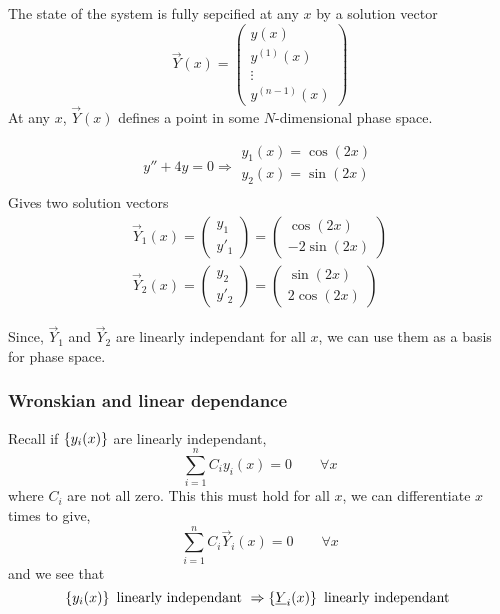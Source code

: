 \documentclass{article}
\begin{document}
The state of the system is fully sepcified at any $x$ by a solution vector
\[
    \vec Y (x) = \begin{pmatrix}
        y(x) \\ y^{(1)}(x) \\ \vdots \\ y^{(n-1)}(x)
    \end{pmatrix}
\]
At any $x$, $\vec Y(x)$ defines a point in some $N$-dimensional phase space.

\begin{eg}[SHM]
    \[
        y'' + 4y = 0 \Rightarrow \begin{array}{c}
            y_1(x) = \cos (2x) \\
            y_2(x) = \sin (2x) \\
        \end{array}  
    \]
    Gives two solution vectors
    \begin{align*}
        \vec Y_1 (x) = \begin{pmatrix}
            y_1 \\ y'_1
        \end{pmatrix} = \begin{pmatrix}
            \cos (2x) \\ - 2\sin(2x)
        \end{pmatrix} \\
        \vec Y_2 (x) = \begin{pmatrix}
            y_2 \\ y'_2
        \end{pmatrix} = \begin{pmatrix}
            \sin (2x) \\ 2\cos(2x)
        \end{pmatrix}
    \end{align*}

    Since, $\vec Y_1$ and $\vec Y_2$ are linearly independant for all $x$, we can use them as a basis for phase space.
\end{eg}

\subsubsection{Wronskian and linear dependance}
Recall if $\left\{ y_i (x) \right\}$ are linearly independant, 
\[
    \sum_{i=1}^{n} C_i y_i (x) = 0 \qquad \forall x
\]
where $C_i$ are not all zero. This this must hold for all $x$, we can differentiate $x$ times to give,
\[
    \sum_{i=1}^{n} C_i \vec Y_i (x) = 0 \qquad \forall x
\]
and we see that
\[
    \left\{ y_i (x) \right\} \text{ linearly independant } \Rightarrow \left\{ \underline{Y}_i (x) \right\} \text{ linearly independant }
\]
\end{document}
